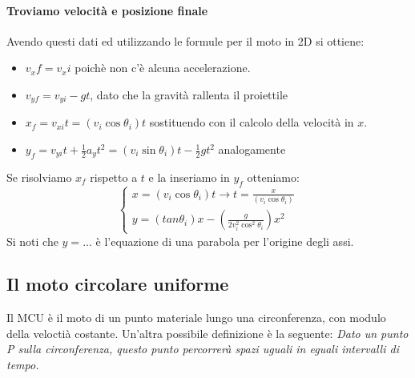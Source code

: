\documentclass[12pt, a4paper, openany]{book}
\begin{document}
\paragraph*{Troviamo velocità e posizione finale}
Avendo questi dati ed utilizzando le formule per il moto in 2D si ottiene:
\begin{itemize}
    \item $v_xf = v_xi$ poichè non c'è alcuna accelerazione.
    \item $v_{yf} = v_{yi} - gt$, dato che la gravità rallenta il proiettile
\end{itemize}
\begin{itemize}
    \item $x_f = v_{xi}t = (v_i \cos \theta_i) t$ sostituendo con il calcolo della velocità in $x$.
    \item $y_f = v_{yi}t + \frac{1}{2} a_yt^2 = (v_i \sin \theta_i)t - \frac{1}{2} gt^2$ analogamente
\end{itemize}
Se risolviamo $x_f$ rispetto a $t$ e la inseriamo in $y_f$ otteniamo:
\[
    \begin{cases}
        x = (v_i \cos \theta_i) t \to t = \frac{x}{(v_i \cos \theta_i)} \\
        y = (tan \theta_i) x- (\frac{g}{2v_i^2\cos^2 \theta_i})x^2
    \end{cases}
\]
Si noti che $y=...$ è l'equazione di una parabola per l'origine degli assi.


\subsection{Il moto circolare uniforme}
Il MCU è il moto di un punto materiale lungo una circonferenza, con modulo della veloctià costante.
Un'altra possibile definizione è la seguente: \emph{Dato un punto P sulla circonferenza, questo punto percorrerà spazi uguali in eguali intervalli di tempo.}
\end{document}
